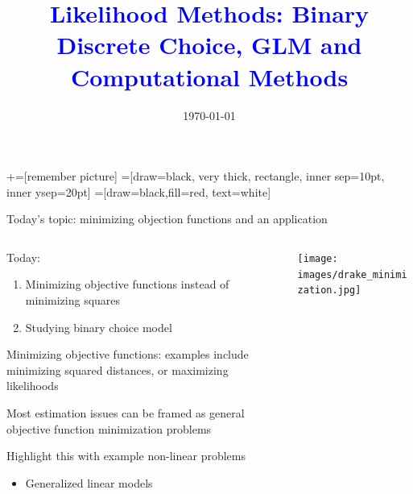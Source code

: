 \documentclass[notes,11pt, aspectratio=169]{beamer}
\title[]{\textcolor{blue}{Likelihood Methods: Binary Discrete Choice, GLM and Computational Methods}}
\author[PGP]{}
\institute[FRBNY]{\small{Paul Goldsmith-Pinkham}}
\date{\today}
\newenvironment{wideitemize}{\itemize\addtolength{\itemsep}{10pt}}{\enditemize}
\begin{document}
\newcommand\marktopleft[1]{%
    \tikz[overlay,remember picture] 
        \node (marker-#1-a) at (-.3em,.3em) {};%
}
\newcommand\markbottomright[2]{%
    \tikz[overlay,remember picture] 
        \node (marker-#1-b) at (0em,0em) {};%
}
+=[remember picture] 
 =[draw=black, very thick, rectangle, inner sep=10pt, inner ysep=20pt]
 =[draw=black,fill=red, text=white]

\begin{frame}
\maketitle

\end{frame}


\begin{frame}{Today's topic: minimizing objection functions and an application }
  \begin{columns}[T] %
    \begin{column}{.6\textwidth}
      \begin{wideitemize}
      \item Today: 
        \begin{enumerate}
        \item Minimizing objective functions instead of minimizing squares
        \item Studying binary choice model
        \end{enumerate}
      \item Minimizing objective functions: examples include
        minimizing squared distances, or maximizing likelihoods
      \item Most estimation issues can be framed as general
        objective function minimization problems
      \item Highlight this with example non-linear problems
        \begin{itemize}
        \item Generalized linear models 
        \end{itemize}
      \end{wideitemize}
    \end{column}%
  \hfill%
  \begin{column}{.4\textwidth}
    \texttt{[image: images/drake\_minimization.jpg]}
  \end{column}
\end{columns}
\end{frame}
\end{document}

